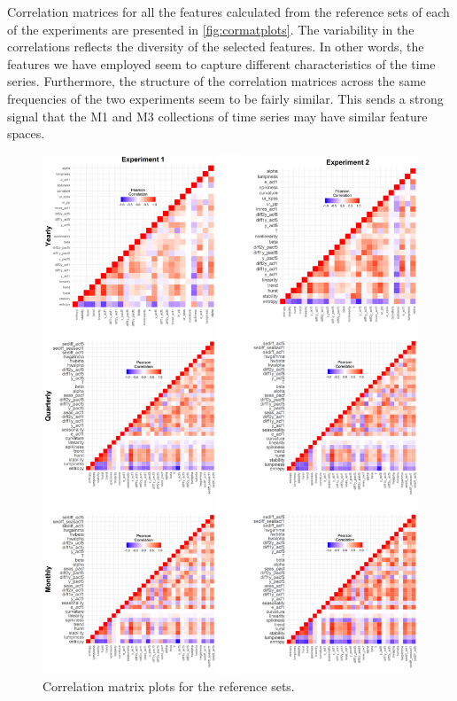 \documentclass[11pt,a4paper,]{article}
\theoremstyle{definition}
\theoremstyle{definition}
\theoremstyle{definition}
\theoremstyle{remark}
\begin{document}
Correlation matrices for all the features calculated from the reference
sets of each of the experiments are presented in
\autoref{fig:cormatplots}. The variability in the correlations reflects
the diversity of the selected features. In other words, the features we
have employed seem to capture different characteristics of the time
series. Furthermore, the structure of the correlation matrices across
the same frequencies of the two experiments seem to be fairly similar.
This sends a strong signal that the M1 and M3 collections of time series
may have similar feature spaces.

\begin{figure}

{\centering \includegraphics[width=\textwidth]{figure/cormatplots-1} 

}

\caption{ Correlation matrix plots for the reference sets.}\label{fig:cormatplots}
\end{figure}
\end{document}
